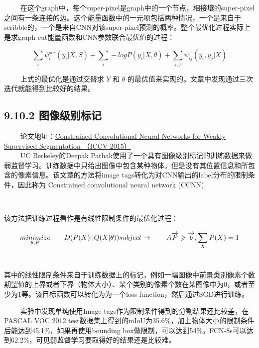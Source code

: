   
在这个graph中，每个super-pixel是graph中的一个节点，相接壤的super-pixel之间有一条连接的边。这个能量函数中的一元项包括两种情况，一个是来自于scribble的，一个是来自CNN对该super-pixel预测的概率。整个最优化过程实际上是求graph
cut能量函数和CNN参数联合最优值的过程：

\[
\sum_{i}\psi _i^{scr}\left(y_i|X,S\right)+\sum _i-logP\left(y_i| X,\theta\right)+\sum_{i,j}\psi _{ij}\left(y_i,y_j|X\right)
\]

   上式的最优化是通过交替求 \(Y\) 和 \(\theta\)
的最优值来实现的。文章中发现通过三次迭代就能得到比较好的结果。

\begin{figure}
\centering
\end{figure}

\subsection{9.10.2
图像级别标记}\label{ux56feux50cfux7ea7ux522bux6807ux8bb0}

  
论文地址：\href{https://www.cv-foundation.org/openaccess/content_iccv_2015/papers/Pathak_Constrained_Convolutional_Neural_ICCV_2015_paper.pdf}{Constrained
Convolutional Neural Networks for Weakly Supervised Segmentation （ICCV
2015）}\\
   UC Berkeley的Deepak
Pathak使用了一个具有图像级别标记的训练数据来做弱监督学习。训练数据中只给出图像中包含某种物体，但是没有其位置信息和所包含的像素信息。该文章的方法将image
tags转化为对CNN输出的label分布的限制条件，因此称为 Constrained
convolutional neural network (CCNN).

  

该方法把训练过程看作是有线性限制条件的最优化过程：

\[
\underset{\theta ,P}{minimize}\qquad D(P(X)||Q(X|\theta ))\\
subject\to\qquad A\overrightarrow{P} \geqslant \overrightarrow{b},\sum_{X}^{ }P(X)=1
\]   

其中的线性限制条件来自于训练数据上的标记，例如一幅图像中前景类别像素个数期望值的上界或者下界（物体大小）、某个类别的像素个数在某图像中为0，或者至少为1等。该目标函数可以转化为为一个loss
function，然后通过SGD进行训练。

   实验中发现单纯使用Image
tags作为限制条件得到的分割结果还比较差，在PASCAL VOC 2012
test数据集上得到的mIoU为35.6\%，加上物体大小的限制条件后能达到45.1\%，如果再使用bounding
box做限制，可以达到54\%。FCN-8s可以达到62.2\%，可见弱监督学习要取得好的结果还是比较难。

